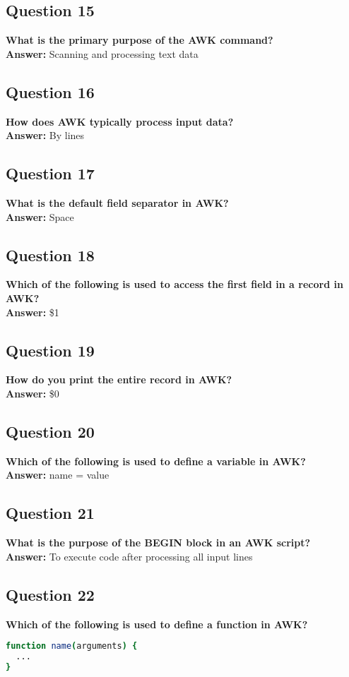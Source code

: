 \documentclass[11pt,parskip]{scrartcl}
\begin{document}
\subsection*{Question 15} 
\textbf{What is the primary purpose of the AWK command?} \\
\textbf{Answer:} Scanning and processing text data

\subsection*{Question 16}
\textbf{How does AWK typically process input data?} \\
\textbf{Answer:} By lines

\subsection*{Question 17}
\textbf{What is the default field separator in AWK?} \\
\textbf{Answer:} Space

\subsection*{Question 18}
\textbf{Which of the following is used to access the first field in a record in AWK?} \\
\textbf{Answer:} \$1

\subsection*{Question 19}
\textbf{How do you print the entire record in AWK?} \\
\textbf{Answer:} \$0

\subsection*{Question 20}
\textbf{Which of the following is used to define a variable in AWK?} \\
\textbf{Answer:} name = value

\subsection*{Question 21}
\textbf{What is the purpose of the BEGIN block in an AWK script?} \\
\textbf{Answer:} To execute code after processing all input lines

\subsection*{Question 22} 
\textbf{Which of the following is used to define a function in AWK?} \\
\begin{lstlisting}[language=bash]
function name(arguments) {
  ...
}
\end{lstlisting}
\end{document}
